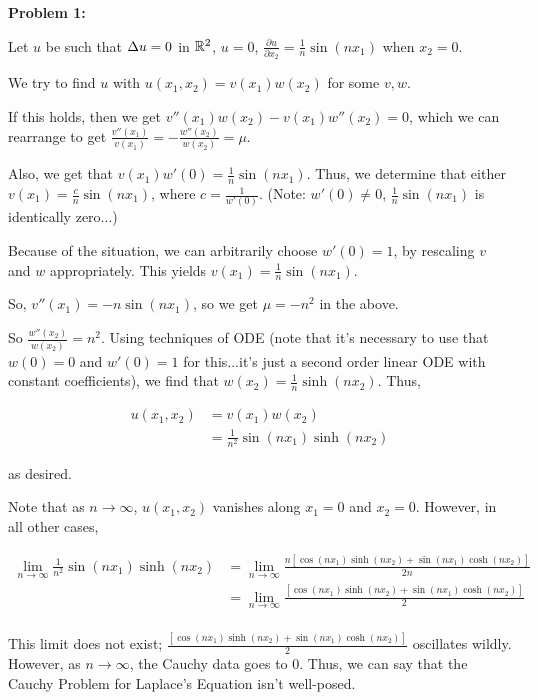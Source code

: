 \documentclass[a4paper,12pt]{article}
\begin{document}
{\bf Problem 1:}

Let $u$ be such that $\Delta u = 0$ in $\mathbb{R}^2$, $u = 0$, $\frac{\partial u}{\partial x_2} = \frac{1}{n} \sin(nx_1)$ when $x_2=0$.

We try to find $u$ with $u(x_1,x_2) = v(x_1)w(x_2)$ for some $v,w$.

If this holds, then we get $v''(x_1)w(x_2) - v(x_1)w''(x_2) = 0$, which we can rearrange to get $\frac{v''(x_1)}{v(x_1)} = - \frac{w''(x_2)}{w(x_2)} = \mu$.

Also, we get that $v(x_1)w'(0) = \frac{1}{n} \sin(nx_1)$. Thus, we determine that either $v(x_1) = \frac{c}{n} \sin(nx_1)$, where $c = \frac{1}{w'(0)}$. (Note: $w'(0) \neq 0$, $\frac{1}{n} \sin(nx_1)$ is identically zero...)

Because of the situation, we can arbitrarily choose $w'(0) = 1$, by rescaling $v$ and $w$ appropriately. This yields $v(x_1) = \frac{1}{n} \sin(nx_1)$.

So, $v''(x_1) = -n \sin(nx_1)$, so we get $\mu = -n^2$ in the above.

So $\frac{w''(x_2)}{w(x_2)} = n^2$. Using techniques of ODE (note that it's necessary to use that $w(0)= 0$ and $w'(0) = 1$ for this...it's just a second order linear ODE with constant coefficients), we find that $w(x_2) = \frac{1}{n}\sinh(nx_2)$. Thus, 

\begin{align*}
u(x_1,x_2) &= v(x_1)w(x_2) \\
&= \frac{1}{n^2} \sin(nx_1)\sinh(nx_2)
\end{align*}

as desired.

Note that as $n \to \infty$, $u(x_1,x_2)$ vanishes along $x_1=0$ and $x_2=0$. However, in all other cases,

\begin{align*}
\lim\limits_{n \to \infty} \frac{1}{n^2} \sin(nx_1)\sinh(nx_2) &= \lim\limits_{n \to \infty} \frac{n\left[\cos(nx_1)\sinh(nx_2) + \sin(nx_1)\cosh(nx_2)\right]}{2n}\\
&= \lim\limits_{n \to \infty} \frac{\left[\cos(nx_1)\sinh(nx_2) + \sin(nx_1)\cosh(nx_2)\right]}{2}\\
\end{align*}

This limit does not exist; $\frac{\left[\cos(nx_1)\sinh(nx_2) + \sin(nx_1)\cosh(nx_2)\right]}{2}$ oscillates wildly. However, as $n \to \infty$, the Cauchy data goes to $0$. Thus, we can say that the Cauchy Problem for Laplace's Equation isn't well-posed.
\end{document}
